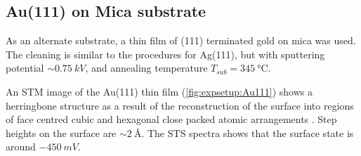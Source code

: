\subsection*{Au(111) on Mica substrate}

As an alternate substrate, a thin film of (111) terminated gold on mica was used. The cleaning is similar to the procedures for Ag(111), but with sputtering potential $\sim \SI{0.75}{kV}$, and annealing temperature $T_{sub} = \SI{345}{\celsius}$.

An \ac{STM} image of the Au(111) thin film (\autoref{fig:expsetup:Au111}) shows a herringbone structure as a result of the reconstruction of the surface into regions of face centred cubic and hexagonal close packed atomic arrangements . Step heights on the surface are $\sim \SI{2}{\angstrom}$. The \ac{STS} spectra shows that the surface state is around $\SI{-450}{mV}$.

